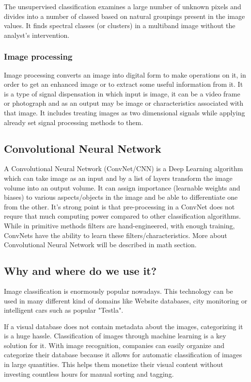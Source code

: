 \documentclass[conference]{IEEEtran}
\begin{document}
The unsupervised classification examines a large number of unknown pixels and divides into a number of classed based on natural groupings present in the image values. It finds spectral classes (or clusters) in a multiband image without the analyst’s intervention.
\\
\subsubsection{Image processing}
Image processing converts an image into digital form to make operations on it, in order to get an enhanced image or to extract some useful information from it. It is a type of signal dispensation in which input is image, it can be a video frame or photograph and as an output may be image or characteristics associated with that image. It includes treating images as two dimensional signals while applying already set signal processing methods to them. 
\subsection{Convolutional Neural Network}
A Convolutional Neural Network (ConvNet/CNN) is a Deep Learning algorithm which can take image as an input and by a list of layers transform the image volume into an output volume. It can assign importance (learnable weights and biases) to various aspects/objects in the image and be able to differentiate one from the other. It's strong point is that pre-processing in a ConvNet does not requre that much computing power compared to other classification algorithms. While in primitive methods filters are hand-engineered, with enough training, ConvNets have the ability to learn these filters/characteristics. More about Convolutional Neural Network will be described in math section.
\subsection{Why and where do we use it?}
Image classification is enormously popular nowadays. This technology can be used in many different kind of domains like Website databases, city monitoring or intelligent cars such as popular "Testla".

If a visual database does not contain metadata about the images, categorizing it is a huge hassle. Classification of images through machine learning is a key solution for it. With image recognition, companies can easily organize and categorize their database because it allows for automatic classification of images in large quantities. This helps them monetize their visual content without investing countless hours for manual sorting and tagging.
\end{document}
